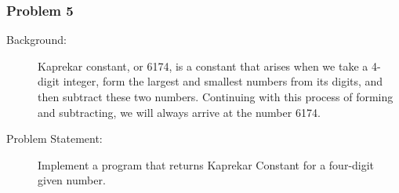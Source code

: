 \documentclass[14pt]{beamer}
\begin{document}
    \begin{frame}
	\frametitle{Problem 5}
	\begin{description}
	    \item [Background:] Kaprekar constant, or 6174, is a constant that arises when we take a 4-digit integer, form the largest and smallest numbers from its digits, and then subtract these two numbers. Continuing with this process of forming and subtracting, we will always arrive at the number 6174.
	     \item [Problem Statement:] Implement a program that returns Kaprekar Constant for a four-digit given number.
	\end{description}
    \end{frame}
\end{document}
